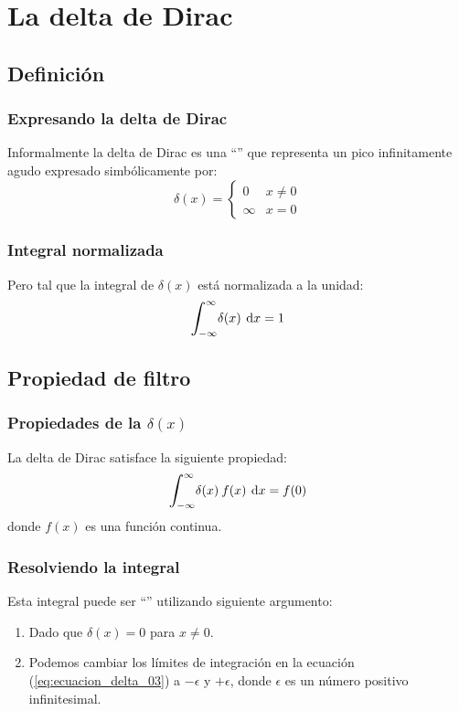 \documentclass[12pt]{beamer}
\begin{document}
\section{La delta de Dirac}
\subsection{Definición}

\begin{frame}
\frametitle{Expresando la delta de Dirac}
Informalmente la delta de Dirac es una \enquote{} que representa un pico infinitamente agudo expresado simbólicamente por:
\pause
\begin{equation}
\delta (x) = \begin{cases}
0 & x \neq 0 \\
\infty & x = 0
\end{cases}
\label{eq:ecuacion_delta_01}
\end{equation}
\end{frame}

\begin{frame}
\frametitle{Integral normalizada}
Pero tal que la integral de $\delta (x)$ está normalizada a la unidad:
\pause
\begin{equation}
\scaleint{6ex}_{\bs -\infty}^{\infty} \delta (x) \: \dd{x} = 1 
\label{eq:ecuacion_delta_02}
\end{equation}
\end{frame}

\subsection{Propiedad de filtro}

\begin{frame}
\frametitle{Propiedades de la $\delta (x)$}
La delta de Dirac satisface la siguiente propiedad:
\pause
\begin{equation}
\scaleint{6ex}_{\bs -\infty}^{\infty} \delta (x) \: f (x) \: \dd{x} = f (0)
\label{eq:ecuacion_delta_03}
\end{equation}
donde $f (x)$ es una función continua.
\end{frame}

\begin{frame}
\frametitle{Resolviendo la integral}
Esta integral puede ser \enquote{} utilizando siguiente argumento: \pause
{}
\begin{enumerate}[<+->]
\item Dado que $\delta (x) = 0$ para $x \neq 0$.
\item Podemos cambiar los límites de integración en la ecuación (\ref{eq:ecuacion_delta_03}) a $- \epsilon$ y $+ \epsilon$, donde $\epsilon$ es un número positivo infinitesimal.
\seti
\end{enumerate}
\end{frame}
\end{document}
